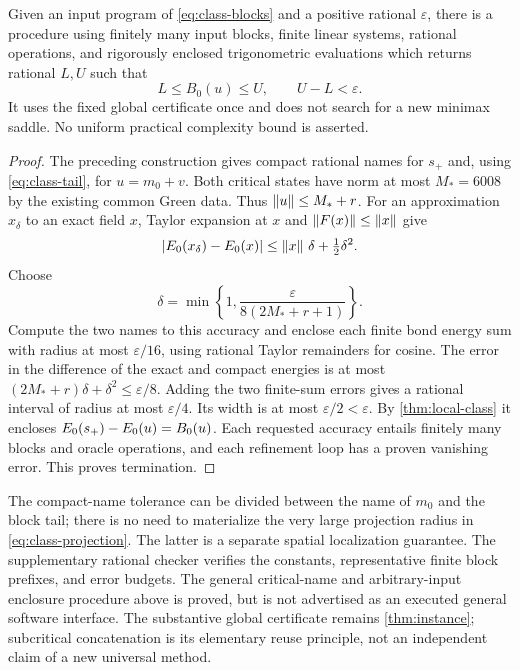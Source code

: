 \begin{theorem}
\label{thm:class-termination}
Given an input program of \eqref{eq:class-blocks} and a positive rational
$\varepsilon$, there is a procedure using finitely many input blocks,
finite linear systems, rational operations, and rigorously enclosed
trigonometric evaluations which returns rational $L,U$ such that
\begin{equation}\label{eq:class-enclosure}
 L\le B_0(u)\le U,\qquad U-L<\varepsilon.
\end{equation}
It uses the fixed global certificate once and does not search for a new
minimax saddle. No uniform practical complexity bound is asserted.
\end{theorem}
\begin{proof}
The preceding construction gives compact rational names for $s_+$
and, using \eqref{eq:class-tail}, for $u=m_0+v$.
Both critical states have norm at most $M_*=6008$ by the existing
common Green data. Thus $\left\lVert u\right\rVert\le M_*+r$.
For an approximation $x_\delta$ to an exact field $x$, Taylor expansion
at $x$ and $\left\lVert F(x)\right\rVert\le\left\lVert x\right\rVert$ give
\[
 |E_0(x_\delta)-E_0(x)|\le\left\lVert x\right\rVert\,\delta+\tfrac12\delta^2.
\]
Choose
\[
 \delta=\min\left\{1,
 \frac{\varepsilon}{8(2M_*+r+1)}\right\}.
\]
Compute the two names to this accuracy and enclose each finite bond
energy sum with radius at most $\varepsilon/16$, using rational Taylor
remainders for cosine. The error in the difference of the exact and
compact energies is at most
$(2M_*+r)\delta+\delta^2\le\varepsilon/8$.
Adding the two finite-sum errors gives a rational interval of radius
at most $\varepsilon/4$. Its width is at most
$\varepsilon/2<\varepsilon$. By \cref{thm:local-class} it encloses
$E_0(s_+)-E_0(u)=B_0(u)$. Each requested accuracy entails finitely many
blocks and oracle operations, and each refinement loop has a proven
vanishing error. This proves termination.
\end{proof}

The compact-name tolerance can be divided between the name of $m_0$
and the block tail; there is no need to materialize the very large
projection radius in \eqref{eq:class-projection}. The latter is a
separate spatial localization guarantee. The supplementary rational
checker verifies the constants, representative finite block prefixes,
and error budgets. The general critical-name and arbitrary-input
enclosure procedure above is proved, but is not advertised as an
executed general software interface. The substantive global certificate
remains \cref{thm:instance}; subcritical concatenation is its elementary
reuse principle, not an independent claim of a new universal method.
